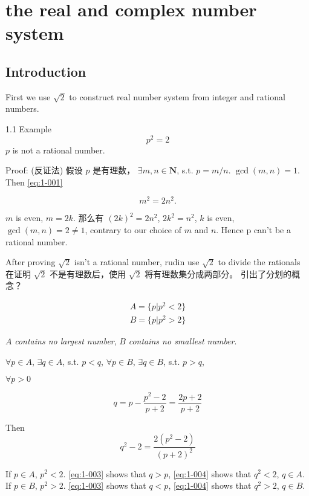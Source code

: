 \chapter{the real and complex number system}

\section{Introduction}
First we use $\sqrt{2}$ to construct real number system from integer and rational numbers.

1.1 Example
\begin{equation}\label{eq:1-001}
    p^2=2
\end{equation}
$p$ is not a rational number.

Proof: (反证法) 假设 $p$ 是有理数， $\exists m,n \in \mathbf{N}$, s.t. $p=m/n$. $\gcd (m,n) = 1$.
Then \ref{eq:1-001}

\begin{equation}\label{eq:1-002}
    m^2 = 2n^2.
\end{equation}

$m$ is even, $m = 2k$.
那么有 $(2k)^2 = 2n^2$, $2k^2 = n^2$, $k$ is even, $\gcd (m,n)=2\neq 1$,
contrary to our choice of $m$ and $n$. Hence p can't be a rational number.

After proving $\sqrt{2}$ isn't a rational number, rudin use $\sqrt{2}$ to divide the rationals
在证明 $\sqrt{2}$ 不是有理数后，使用 $\sqrt{2}$ 将有理数集分成两部分。 引出了分划的概念？

\begin{align*}
    A = \{p|p^2<2\}\\
    B = \{p|p^2>2\}
\end{align*}

$A$ \emph{contains no largest number},
$B$ \emph{contains no smallest number}.

$\forall p\in A$, $\exists q\in A$, s.t. $p<q$,
$\forall p\in B$, $\exists q\in B$, s.t. $p>q$,

$\forall p>0$

\begin{equation}\label{eq:1-003}
    q = p-\frac{p^2-2}{p+2} = \frac{2p+2}{p+2}
\end{equation}

Then 
\begin{equation}
    \label{eq:1-004}
    q^2 - 2 = \frac{2(p^2-2)}{(p+2)^2}
\end{equation}

If $p\in A$, $p^2<2$. \ref{eq:1-003} shows that $q>p$, \ref{eq:1-004} shows that $q^2<2$, $q\in A$.
If $p\in B$, $p^2>2$. \ref{eq:1-003} shows that $q<p$, \ref{eq:1-004} shows that $q^2>2$, $q\in B$.


